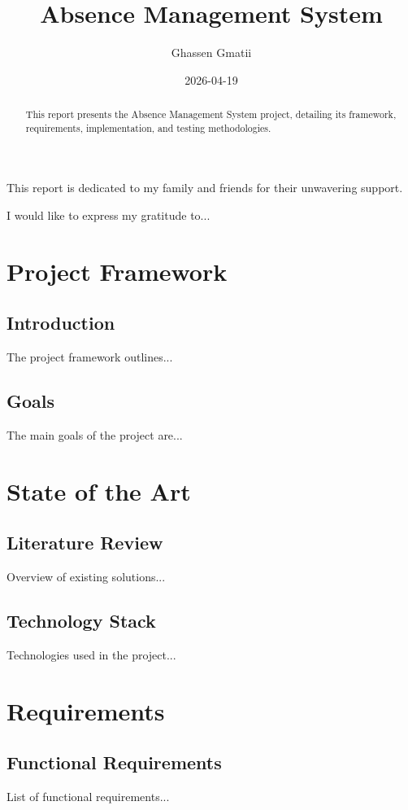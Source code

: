 \documentclass[a4paper,12pt]{report}
\title{Absence Management System}
\author{Ghassen Gmatii}
\date{2026-04-19}
\begin{document}
\maketitle

\begin{dedication}
This report is dedicated to my family and friends for their unwavering support.
\end{dedication}

\begin{acknowledgements}
I would like to express my gratitude to...
\end{acknowledgements}

\begin{abstract}
This report presents the Absence Management System project, detailing its framework, requirements, implementation, and testing methodologies.
\end{abstract}

\tableofcontents

\chapter{Project Framework}
\section{Introduction}
The project framework outlines...
\section{Goals}
The main goals of the project are...

\chapter{State of the Art}
\section{Literature Review}
Overview of existing solutions...
\section{Technology Stack}
Technologies used in the project...

\chapter{Requirements}
\section{Functional Requirements}
List of functional requirements...
\end{document}
